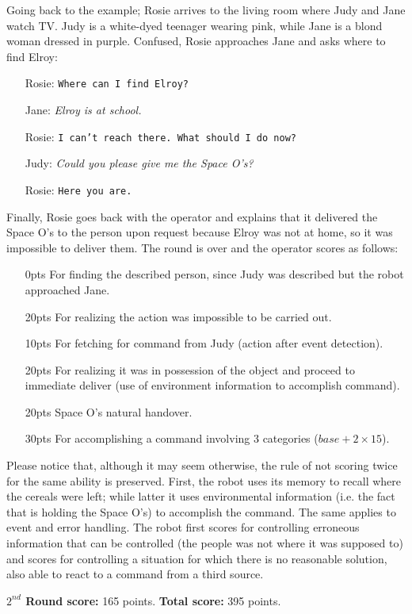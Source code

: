 Going back to the example; Rosie arrives to the living room where Judy and Jane watch TV. Judy is a white-dyed teenager wearing pink, while Jane is a blond woman dressed in purple. Confused, Rosie approaches Jane and asks where to find Elroy:
\begin{itemize}
	\item[Rosie:] \texttt{Where can I find Elroy?}
	\item[Jane: ] \textit{Elroy is at school.}
	\item[Rosie:] \texttt{I can't reach there. What should I do now?}
	\item[Judy: ] \textit{Could you please give me the Space O's?}
	\item[Rosie:] \texttt{Here you are.}
\end{itemize}

Finally, Rosie goes back with the operator and explains that it delivered the Space O's to the person upon request because Elroy was not at home, so it was impossible to deliver them. The round is over and the operator scores as follows:
\begin{itemize}
	\item[ 0pts] For finding the described person, since Judy was described but the robot approached Jane.
	\item[20pts] For realizing the action was impossible to be carried out.
	\item[10pts] For fetching for command from Judy (action after event detection).
	\item[20pts] For realizing it was in possession of the object and proceed to immediate deliver (use of environment information to accomplish command).
	\item[20pts] Space O's natural handover.
	\item[30pts] For accomplishing a command involving 3 categories ($base + 2\times15$).
\end{itemize}

Please notice that, although it may seem otherwise, the rule of not scoring twice for the same ability is preserved. First, the robot uses its memory to recall where the cereals were left; while latter it uses environmental information (i.e. the fact that is holding the Space O's) to accomplish the command. The same applies to event and error handling. The robot first scores for controlling erroneous information that can be controlled (the people was not where it was supposed to) and scores for controlling a situation for which there is no reasonable solution, also able to react to a command from a third source.

\textbf{$2^{nd}$ Round score:} 165 points. \textbf{Total score:} 395 points.
